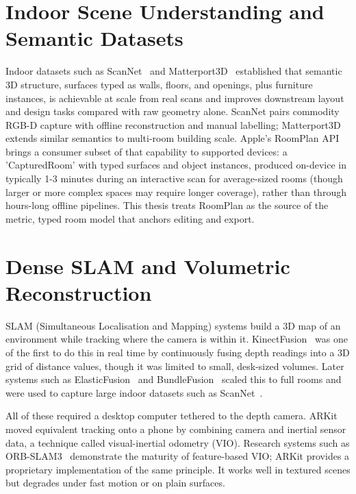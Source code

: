\section{Indoor Scene Understanding and Semantic Datasets}
\label{sec:soa:indoor}

Indoor datasets such as ScanNet~\cite{dai2017scannet} and
Matterport3D~\cite{CAS+17} established that semantic 3D structure, surfaces
typed as walls, floors, and openings, plus furniture instances, is achievable
at scale from real scans and improves downstream layout and design tasks
compared with raw geometry alone. ScanNet pairs commodity RGB-D capture with
offline reconstruction and manual labelling; Matterport3D extends similar
semantics to multi-room building scale. Apple's RoomPlan API~\cite{apple2024roomplan2}
brings a consumer subset of that capability to supported devices: a
'CapturedRoom' with typed surfaces and object instances, produced
on-device in typically 1-3 minutes during an interactive scan for
average-sized rooms (though larger or more complex spaces may require longer
coverage), rather than through hours-long offline pipelines. This thesis treats RoomPlan as the
source of the metric, typed room model that anchors editing and export.

\section{Dense SLAM and Volumetric Reconstruction}
\label{sec:soa:slam}

SLAM (Simultaneous Localisation and Mapping) systems build a 3D map of an
environment while tracking where the camera is within it.
KinectFusion~\cite{newcombe2011kinectfusion} was one of the first to do
this in real time by continuously fusing depth readings into a 3D grid of
distance values, though it was limited to small, desk-sized volumes.
Later systems such as ElasticFusion~\cite{WLS+15} and
BundleFusion~\cite{DAN+17} scaled this to full rooms and were used to
capture large indoor datasets such as ScanNet~\cite{dai2017scannet}.

All of these required a desktop computer tethered to the depth camera.
ARKit moved equivalent tracking onto a phone by combining camera and
inertial sensor data, a technique called visual-inertial odometry (VIO).
Research systems such as ORB-SLAM3~\cite{CEG+21} demonstrate the maturity
of feature-based VIO; ARKit provides a proprietary implementation of the
same principle. It works well in textured scenes but degrades under fast
motion or on plain surfaces.

